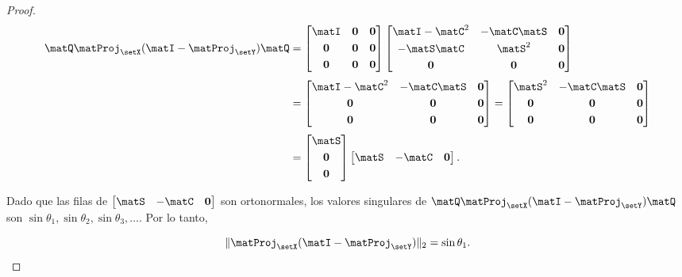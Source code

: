 \begin{proof}
            \[\begin{aligned} \matQ\matProj_{\setX}(\matI-\matProj_{\setY})\matQ & = \begin{bmatrix} \matI & \mathbf{0} & \mathbf{0}\\[0.3em] \mathbf{0} & \mathbf{0} & \mathbf{0}\\[0.3em] \mathbf{0} & \mathbf{0} & \mathbf{0}
            \end{bmatrix}\begin{bmatrix} \matI - \matC^2 & -\matC\matS & \mathbf{0}\\[0.3em] -\matS\matC & \matS^2 & \mathbf{0}\\[0.3em] \mathbf{0} & \mathbf{0} & \mathbf{0}
            \end{bmatrix}\\[0.3em]
            & = \begin{bmatrix} \matI - \matC^2 & -\matC\matS & \mathbf{0}\\[0.3em] \mathbf{0} & \mathbf{0} & \mathbf{0}\\[0.3em] \mathbf{0} & \mathbf{0} & \mathbf{0}
            \end{bmatrix} = \begin{bmatrix} \matS^2 & -\matC\matS & \mathbf{0}\\[0.3em] \mathbf{0} & \mathbf{0} & \mathbf{0}\\[0.3em] \mathbf{0} & \mathbf{0} & \mathbf{0}
            \end{bmatrix}\\[0.3em]
            & = \begin{bmatrix}\matS\\[0.3em]\mathbf{0}\\[0.3em] \mathbf{0}\end{bmatrix}\begin{bmatrix} \matS & -\matC & \mathbf{0} 
            \end{bmatrix}. \end{aligned}\]

            Dado que las filas de $\begin{bmatrix} \matS & -\matC & \mathbf{0} 
            \end{bmatrix}$ son ortonormales, los valores singulares de $\matQ\matProj_{\setX}(\matI-\matProj_{\setY})\matQ$ son $\sin\theta_1,\sin\theta_2,\sin\theta_3,\ldots$. Por lo tanto,
            
            \begin{equation}\|\matProj_{\setX}(\matI-\matProj_{\setY})\|_2 = \sin\theta_1.\label{Eq:appendix_sin1}\end{equation}


\end{proof}
